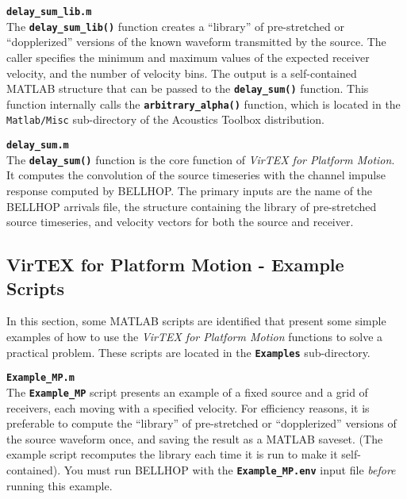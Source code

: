 \documentclass[12pt, letterpaper, oneside]{article}
\begin{document}
\begin{description}

\item {\tt \bf delay\_sum\_lib.m}\hfill \\
The {\tt \bf delay\_sum\_lib()} function creates a ``library''
of pre-stretched or ``dopplerized'' versions of the known waveform
transmitted by the source. The caller specifies the minimum and maximum
values of the expected receiver velocity, and the number of velocity
bins. The output is a self-contained MATLAB structure that can be passed
to the {\tt \bf delay\_sum()} function. This function internally calls
the {\tt \bf arbitrary\_alpha()} function, which is located in the {\tt
Matlab/Misc} sub-directory of the Acoustics Toolbox distribution.

\item {\tt \bf delay\_sum.m}\hfill \\
The {\tt \bf delay\_sum()} function is the core function of {\em VirTEX for
Platform Motion}. It computes the convolution of the source timeseries
with the channel impulse response computed by BELLHOP. The primary inputs
are the name of the BELLHOP arrivals file, the structure containing the
library of pre-stretched source timeseries, and velocity vectors for both
the source and receiver.

\end{description}

\subsection{VirTEX for Platform Motion - Example Scripts}
In this section, some MATLAB scripts are identified that present some
simple examples of how to use the {\em VirTEX for Platform Motion}
functions to solve a practical problem. These scripts are located in
the {\tt \bf Examples} sub-directory.

\begin{description}

\item {\tt \bf Example\_MP.m}\hfill \\
The {\tt \bf Example\_MP} script presents an example of a fixed source
and a grid of receivers, each moving with a specified velocity. For
efficiency reasons, it is preferable to compute the ``library'' of
pre-stretched or ``dopplerized'' versions of the source waveform once,
and saving the result as a MATLAB saveset. (The example script recomputes
the library each time it is run to make it self-contained). You must run
BELLHOP with the {\tt \bf Example\_MP.env} input file {\em before}
running this example.

\end{description}
\end{document}
